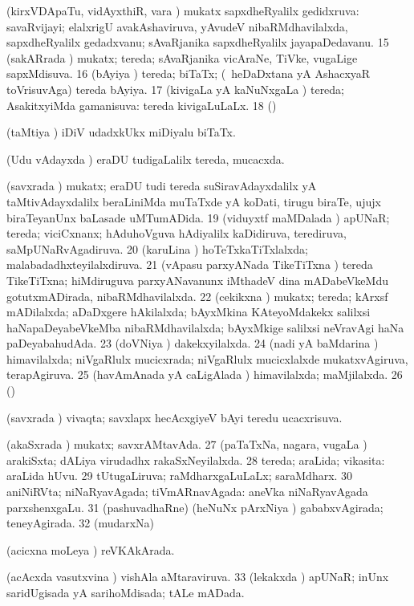{{ (kirxVDApaTu, vidAyxthiR, \mo vara \vi) mukatx
sapxdheRyalilx gedidxruva:  savaRvijayi; elalxrigU
avakAshaviruva, yAvudeV nibaRMdhavilalxda, sapxdheRyalilx gedadxvanu;
sAvaRjanika sapxdheRyalilx jayapaDedavanu. 
\num{15} (sakARrada \vi) mukatx; tereda; sAvaRjanika vicAraNe, TiVke,
\mo vugaLige sapxMdisuva. 
\num{16} (bAyiya \vi) tereda; biTaTx; (\kanmu\ heDaDxtana yA AshacxyaR
toVrisuvAga) tereda bAyiya. 
\num{17} (kivigaLa yA kaNuNxgaLa \vi) tereda; AsakitxyiMda gamanisuva:
 tereda kivigaLuLaLx. 
\num{18} (\saM) 

 (taMtiya \vi) iDiV udadxkUkx miDiyalu biTaTx.

 (Udu vAdayxda \vi) eraDU tudigaLalilx tereda, mucacxda.

 (savxrada \vi) mukatx; eraDU tudi tereda suSiravAdayxdalilx
yA taMtivAdayxdalilx beraLiniMda muTaTxde yA koDati, tirugu biraTe,
ujujx biraTeyanUnx baLasade uMTumADida. 
\num{19} (viduyxtf maMDalada \vi) apUNaR; tereda; viciCxnanx;
hAduhoVguva hAdiyalilx kaDidiruva, terediruva, saMpUNaRvAgadiruva. 
\num{20} (karuLina \vi) hoTeTxkaTiTxlalxda; malabadadhxteyilalxdiruva.
\num{21} (vApasu parxyANada TikeTiTxna \vi) tereda TikeTiTxna;
hiMdiruguva parxyANavanunx iMthadeV dina mADabeVkeMdu gotutxmADirada,
nibaRMdhavilalxda. 
\num{22} (cekikxna \vi) mukatx; tereda; kArxsf mADilalxda; aDaDxgere
hAkilalxda; bAyxMkina KAteyoMdakekx salilxsi haNapaDeyabeVkeMba
nibaRMdhavilalxda; bAyxMkige salilxsi neVravAgi haNa paDeyabahudAda. 
\num{23} (doVNiya \vi) dakekxyilalxda.
\num{24} (nadi yA baMdarina \vi) himavilalxda; niVgaRlulx mucicxrada;
niVgaRlulx mucicxlalxde mukatxvAgiruva, terapAgiruva.
\num{25} (havAmAnada yA caLigAlada \vi) himavilalxda; maMjilalxda.
\num{26} (\dhavxni) 

 (savxrada \vi) vivaqta; savxlapx hecAcxgiyeV bAyi teredu
ucacxrisuva. 

 (akaSxrada \vi) mukatx; savxrAMtavAda.
\num{27} (paTaTxNa, nagara, \mo vugaLa \vi) arakiSxta; dALiya
virudadhx rakaSxNeyilalxda.
\num{28} tereda; araLida; vikasita:  araLida hUvu.
\num{29} tUtugaLiruva; raMdharxgaLuLaLx; saraMdharx.
\num{30} aniNiRVta; niNaRyavAgada; tiVmARnavAgada:  aneVka niNaRyavAgada parxshenxgaLu. 
\num{31} (pashuvadhaRne) (heNuNx pArxNiya \vi) gababxvAgirada; teneyAgirada.
\num{32} (mudarxNa) 

 (acicxna moLeya \vi) reVKAkArada.

 (acAcxda vasutxvina \vi) vishAla aMtaraviruva.
\num{33} (lekakxda \vi) apUNaR; inUnx saridUgisada yA sarihoMdisada;
tALe mADada.}}

